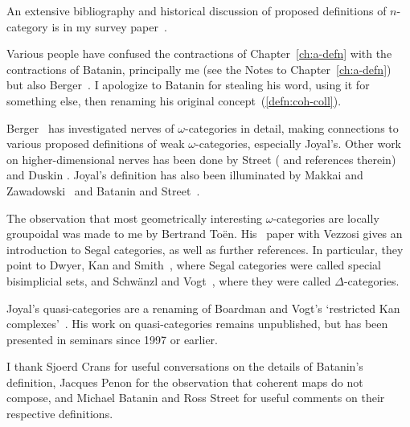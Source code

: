 \begin{notes}

An extensive bibliography and historical discussion of proposed
definitions of $n$-category is in my survey paper~\cite{SDN}. 

Various people have confused the contractions%
%
%
of Chapter~\ref{ch:a-defn}
with the contractions of Batanin, principally me (see the Notes to
Chapter~\ref{ch:a-defn}) but also Berger~\cite[1.20]{Ber}.%
%
%
 I apologize to
Batanin for stealing his word, using it for something else, then
renaming his original concept~(\ref{defn:coh-coll}).

Berger~\cite{Ber}%
%
%
has investigated nerves of $\omega$-categories in detail,
making connections to various proposed definitions of weak
$\omega$-categories, especially Joyal's.  Other work on higher-dimensional
nerves has been done by Street%
%
%
(\cite[\S 10]{StrCS} and references therein)
and Duskin%
%
%
\cite{DusSM1, DusSM2}.  Joyal's definition has also been
illuminated by Makkai%
%
%
and Zawadowski~\cite{MZ}%
%
%
and Batanin%
%
%
and
Street~\cite{BSUPM}.%
%
%

The observation that most geometrically interesting $\omega$-categories are
locally groupoidal was made to me by Bertrand To\"en.%
%
%
 His~\cite{TV} paper
with Vezzosi%
%
%
gives an introduction to Segal categories, as well as further
references.  In particular, they point to Dwyer,%
%
%
Kan%
%
%
and Smith~\cite{DKS},%
%
%
where Segal categories were called special%
%
%
%
%
%
%
bisimplicial sets, and
Schw\"anzl%
%
%
and Vogt~\cite{SV},%
%
%
where they were called $\Delta$-categories.%
%
%
%
%
%

Joyal's quasi-categories are a renaming of Boardman%
%
%
and Vogt's%
%
%
`restricted%
%
%
Kan complexes'~\cite{BV}.  His work on quasi-categories
remains unpublished, but has been presented in seminars since 1997 or
earlier.

I thank Sjoerd Crans for useful conversations on the details of Batanin's
definition, Jacques Penon for the observation that coherent maps do not
compose, and Michael Batanin and Ross Street for useful comments on their
respective definitions.


\end{notes}
